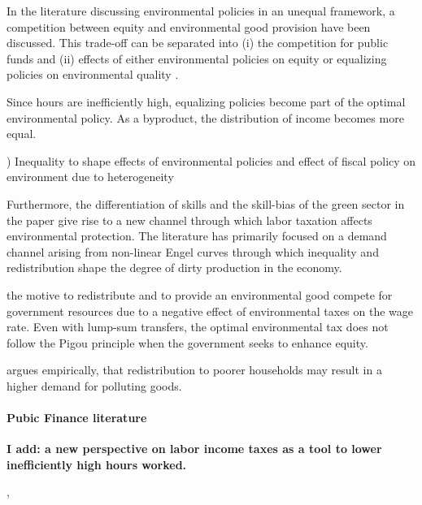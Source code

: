 In the literature discussing environmental policies in an unequal framework, a competition between equity and environmental good provision have been discussed. 
This trade-off can be separated into (i) the competition for public funds \citep{LansBovenberg1996OptimalAnalyses, Jacobs2019RedistributionCurves} and (ii) effects of either environmental policies on equity or equalizing policies on environmental quality \citep{Jacobs2019RedistributionCurves, Sager2019IncomeCurves, Dobkowitz2022}. 

Since hours are inefficiently high, equalizing policies become part of the optimal environmental policy. As a byproduct, the distribution of income becomes more equal.


) Inequality to shape effects of environmental policies and effect of fiscal policy on environment due to heterogeneity

 Furthermore, the differentiation of skills and the skill-bias of the green sector in the paper give rise to a new channel through which labor taxation affects environmental protection. The literature has primarily focused on a demand channel arising from non-linear Engel curves through which inequality and redistribution shape the degree of dirty production in the economy.   

\cite{Jacobs2019RedistributionCurves} the motive to redistribute and to provide an environmental good compete for government resources due to a negative effect of environmental taxes on the wage rate. Even with lump-sum transfers, the optimal environmental tax does not follow the Pigou principle when the government seeks to enhance equity.

\cite{Sager2019IncomeCurves} argues empirically, that redistribution to poorer households may result in a higher demand for polluting goods. 
\paragraph{Pubic Finance literature}
\textbf{I add: a new perspective on labor income taxes as a tool to lower inefficiently high hours worked. }

 \cite{Heathcote2017OptimalFramework}, \cite{Loebbing2019NationalChange}

